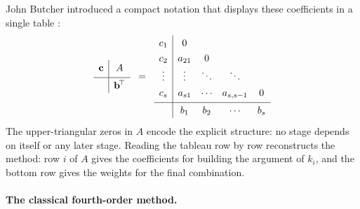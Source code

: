 John Butcher introduced a compact notation that displays these
coefficients in a single table \cite{HairerNorsettWanner1993}:
%
\begin{equation}
  \renewcommand{\arraystretch}{1.3}
  \begin{array}{c|c}
    \mathbf{c} & A \\[2pt]
    \hline
    & \mathbf{b}^{\!\top}
  \end{array}
  \;\;=\;\;
  \begin{array}{c|cccc}
    c_1    & 0      &        &        & \\
    c_2    & a_{21} & 0      &        & \\
    \vdots & \vdots & \ddots & \ddots & \\
    c_s    & a_{s1} & \cdots & a_{s,s-1} & 0 \\[2pt]
    \hline
           & b_1    & b_2    & \cdots & b_s
  \end{array}
  \label{eq:butcher-tableau}
\end{equation}
%
The upper-triangular zeros in $A$ encode the explicit structure: no
stage depends on itself or any later stage.  Reading the tableau
row by row reconstructs the method: row $i$ of $A$ gives the
coefficients for building the argument of $k_i$, and the bottom
row gives the weights for the final combination.

\paragraph{The classical fourth-order method.}

